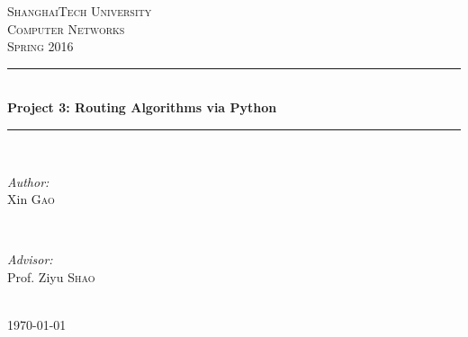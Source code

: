 \documentclass[12pt]{article}
\begin{document}
\begin{titlepage}

\newcommand{\HRule}{\rule{\linewidth}{0.5mm}} %

\center %
 
\textsc{\LARGE ShanghaiTech University}\\[1.5cm] %
\textsc{\Large Computer Networks}\\[0.5cm] %
\textsc{\large Spring 2016}\\[0.5cm] %


\HRule \\[0.4cm]
{ \huge \bfseries Project 3: Routing Algorithms via Python}\\[0.4cm] %
\HRule \\[1.5cm]
 
 
\begin{minipage}{0.4\textwidth}
\begin{flushleft} \large
\emph{Author:}\\
Xin \textsc{Gao} %
\end{flushleft}
\end{minipage}
~
\begin{minipage}{0.4\textwidth}
\begin{flushright} \large
\emph{Advisor:} \\
Prof. Ziyu \textsc{Shao} %
\end{flushright}
\end{minipage}\\[2cm]



{\large \today}\\[2cm] %




\vfill %

\end{titlepage}
\end{document}
